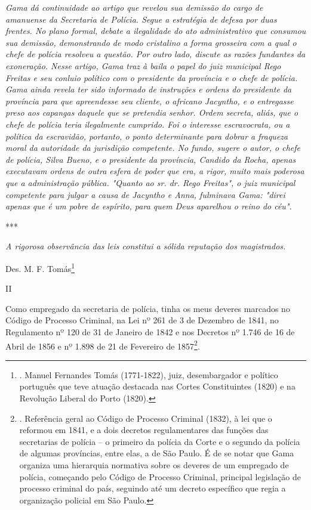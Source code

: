 \emph{Gama dá continuidade ao artigo que revelou sua demissão do cargo
de amanuense da Secretaria de Polícia. Segue a estratégia de defesa por
duas frentes. No plano formal, debate a ilegalidade do ato
administrativo que consumou sua demissão, demonstrando de modo
cristalino a forma grosseira com a qual o chefe de polícia resolveu a
questão. Por outro lado, discute as razões fundantes da exoneração.
Nesse artigo, Gama traz à baila o papel do juiz municipal Rego Freitas e
seu conluio político com o presidente da província e o chefe de polícia.
Gama ainda revela ter sido informado de instruções e ordens do
presidente da província para que apreendesse seu cliente, o africano
Jacyntho, e o entregasse preso aos capangas daquele que se pretendia
senhor. Ordem secreta, aliás, que o chefe de polícia teria ilegalmente
cumprido. Foi o interesse escravocrata, ou a política da escravidão,
portanto, o ponto determinante para dobrar a fraqueza moral da
autoridade da jurisdição competente. No fundo, sugere o autor, o chefe
de polícia, Silva Bueno, e o presidente da província, Candido da Rocha,
apenas executavam ordens de outra esfera de poder que era, a rigor,
muito mais poderosa que a administração pública. "Quanto ao sr. dr. Rego
Freitas", o juiz municipal competente para julgar a causa de Jacyntho e
Anna, fulminava Gama: "direi apenas que é um pobre de espírito, para
quem Deus aparelhou o reino do céu". }

***

\emph{A rigorosa observância das leis constitui a sólida reputação dos
magistrados. }

Des. M. F. Tomás\footnote{. Manuel Fernandes Tomás (1771-1822), juiz,
  desembargador e político português que teve atuação destacada nas
  Cortes Constituintes (1820) e na Revolução Liberal do Porto (1820).}

II

Como empregado da secretaria de polícia, tinha os meus deveres marcados
no Código de Processo Criminal, na Lei nº 261 de 3 de Dezembro de 1841,
no Regulamento nº 120 de 31 de Janeiro de 1842 e nos Decretos nº 1.746
de 16 de Abril de 1856 e nº 1.898 de 21 de Fevereiro de 1857\footnote{.
  Referência geral ao Código de Processo Criminal (1832), à lei que o
  reformou em 1841, e a dois decretos regulamentares das funções das
  secretarias de polícia -- o primeiro da polícia da Corte e o segundo
  da polícia de algumas províncias, entre elas, a de São Paulo. É de se
  notar que Gama organiza uma hierarquia normativa sobre os deveres de
  um empregado de polícia, começando pelo Código de Processo Criminal,
  principal legislação de processo criminal do país, seguindo até um
  decreto específico que regia a organização policial em São Paulo.}.

